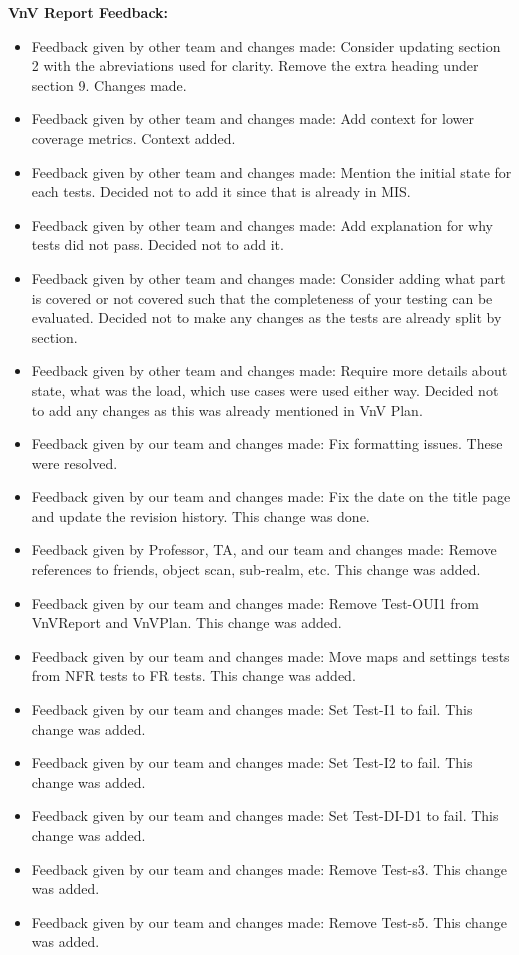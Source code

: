 \documentclass{article}
\begin{document}
\textbf{VnV Report Feedback:}
\begin{itemize}
    \item Feedback given by other team and changes made:  Consider updating section 2 with the abreviations used for clarity. Remove the extra heading under section 9. Changes made.
    \item Feedback given by other team and changes made:  Add context for lower coverage metrics. Context added.
    \item Feedback given by other team and changes made:  Mention the initial state for each tests. Decided not to add it since that is already in MIS.
    \item Feedback given by other team and changes made:  Add explanation for why tests did not pass. Decided not to add it.
    \item Feedback given by other team and changes made:  Consider adding what part is covered or not covered such that the completeness of your testing can be evaluated. Decided not to make any changes as the tests are already split by section.
    \item Feedback given by other team and changes made:  Require more details about state, what was the load, which use cases were used either way. Decided not to add any changes as this was already mentioned in VnV Plan.
    \item Feedback given by our team and changes made: Fix formatting issues. These were resolved.
    \item Feedback given by our team and changes made: Fix the date on the title page and update the revision history. This change was done.
    \item Feedback given by Professor, TA, and our team and changes made: Remove references to friends, object scan, sub-realm, etc. This change was added.
   \item Feedback given by our team and changes made: Remove Test-OUI1 from VnVReport and VnVPlan. This change was added.
    \item Feedback given by our team and changes made: Move maps and settings tests from NFR tests to FR tests. This change was added.
    \item Feedback given by our team and changes made: Set Test-I1 to fail. This change was added.
    \item Feedback given by our team and changes made: Set Test-I2 to fail. This change was added.
    \item Feedback given by our team and changes made: Set Test-DI-D1 to fail. This change was added.
    \item Feedback given by our team and changes made: Remove Test-s3. This change was added.
    \item Feedback given by our team and changes made: Remove Test-s5. This change was added.
\end{itemize}
\end{document}

